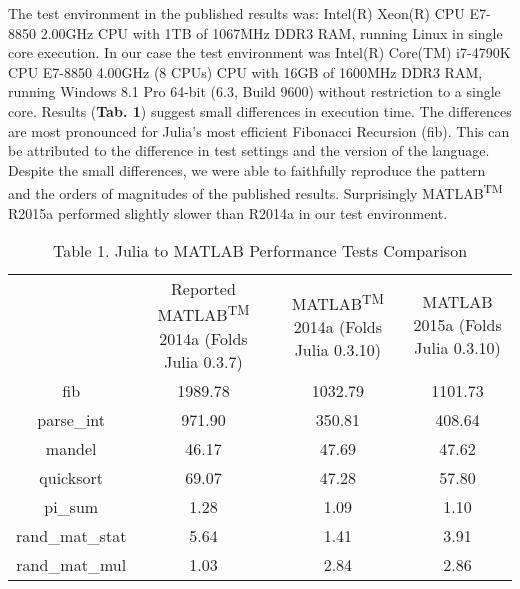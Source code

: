The test environment in the published results was: Intel(R) Xeon(R) CPU E7-8850 2.00GHz CPU with 1TB of 1067MHz DDR3 RAM, running Linux in single core execution. In our case the test environment was Intel(R) Core(TM) i7-4790K CPU E7-8850 4.00GHz (8 CPUs) CPU with 16GB of 1600MHz DDR3 RAM, running Windows 8.1 Pro 64-bit (6.3, Build 9600) without restriction to a single core. Results (\textbf{Tab. 1}) suggest small differences in execution time. The differences are most pronounced for Julia's most efficient Fibonacci Recursion (fib). This can be attributed to the difference in test settings and the version of the language. Despite the small differences, we were able to faithfully reproduce the pattern and the orders of magnitudes of the published results. Surprisingly MATLAB\textsuperscript{TM} R2015a performed slightly slower than R2014a in our test environment.

\begin{table} 
    \begin{tabular}{ c c c c }
         & Reported MATLAB\textsuperscript{TM} 2014a (Folds Julia 0.3.7) & MATLAB\textsuperscript{TM} 2014a (Folds Julia 0.3.10) & MATLAB 2015a (Folds Julia 0.3.10) \\ 
        fib & 1989.78 & 1032.79 & 1101.73 \\ 
        parse\_int & 971.90 & 350.81 & 408.64 \\ 
        mandel & 46.17 & 47.69 & 47.62 \\ 
        quicksort & 69.07 & 47.28 & 57.80 \\ 
        pi\_sum & 1.28 & 1.09 & 1.10 \\ 
        rand\_mat\_stat & 5.64 & 1.41 & 3.91 \\ 
        rand\_mat\_mul & 1.03 & 2.84 & 2.86 \\ 
    \end{tabular}
    \caption{Table 1. Julia to MATLAB Performance Tests Comparison}
\end{table}

  
  
  
  
  
  
  
  
  
  
  
  
  
  
  
  
  
  
  
  
  
  
  
  